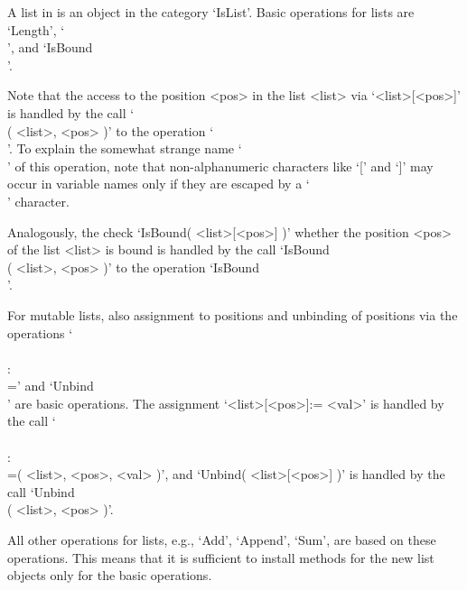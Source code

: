 
A list in {\GAP} is an object in the category `IsList'.
Basic operations for lists are `Length', `\\[\\]', and `IsBound\\[\\]'.

Note that the access to the position <pos> in the list <list>
via `<list>[<pos>]' is handled by the call `\\[\\]( <list>, <pos> )'
to the operation `\\[\\]'.
To explain the somewhat strange name `\\[\\]' of this operation,
note that non-alphanumeric characters like `[' and `]' may occur in
{\GAP} variable names only if they are escaped by a `\\' character.

Analogously, the check `IsBound( <list>[<pos>] )' whether the position
<pos> of the list <list> is bound is handled by the call
`IsBound\\[\\]( <list>, <pos> )' to the operation
`IsBound\\[\\]'.

For mutable lists, also assignment to positions and unbinding of
positions via the operations `\\[\\]\\:\\=' and `Unbind\\[\\]'
are basic operations.
The assignment `<list>[<pos>]:= <val>' is handled by the call
`\\[\\]\\:\\=( <list>, <pos>, <val> )',
and `Unbind( <list>[<pos>] )' is handled by the call
`Unbind\\[\\]( <list>, <pos> )'.

All other operations for lists, e.g., `Add', `Append', `Sum',
are based on these operations.
This means that it is sufficient to install methods for the new list
objects only for the basic operations.

